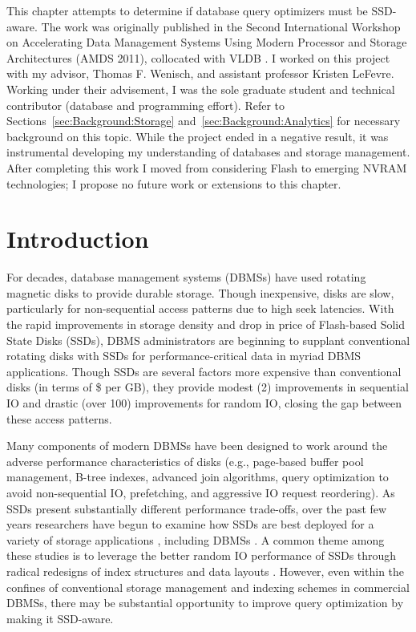 This chapter attempts to determine if database query optimizers must be SSD-aware.
The work was originally published in the Second International Workshop on Accelerating Data Management Systems Using Modern Processor and Storage Architectures (AMDS 2011), collocated with VLDB \cite{PelleyWenisch11}.
I worked on this project with my advisor, Thomas F. Wenisch, and assistant professor Kristen LeFevre.
Working under their advisement, I was the sole graduate student and technical contributor (database and programming effort).
Refer to Sections~\ref{sec:Background:Storage} and~\ref{sec:Background:Analytics} for necessary background on this topic.
While the project ended in a negative result, it was instrumental developing my understanding of databases and storage management.
After completing this work I moved from considering Flash to emerging NVRAM technologies; I propose no future work or extensions to this chapter.

\section{Introduction}
\label{sec:FlashOpti:Intro}

For decades, database management systems (DBMSs) have used rotating magnetic disks to provide durable storage.
Though inexpensive, disks are slow, particularly for non-sequential access patterns due to high seek latencies.
With the rapid improvements in storage density and drop in price of Flash-based Solid State Disks (SSDs), DBMS administrators are beginning to supplant conventional rotating disks with SSDs for performance-critical data in myriad DBMS applications.
Though SSDs are several factors more expensive than conventional disks (in terms of \$ per GB), they provide modest (2\texttimes) improvements in sequential IO and drastic (over 100\texttimes) improvements for random IO, closing the gap between these access patterns.

Many components of modern DBMSs have been designed to work around the adverse performance characteristics of disks (e.g., page-based buffer pool management, B-tree indexes, advanced join algorithms, query optimization to avoid non-sequential IO, prefetching, and aggressive IO request reordering).  
As SSDs present substantially different performance trade-offs, over the past few years researchers have begun to examine how SSDs are best deployed for a variety of storage applications \cite{Bouganim09uflip:understanding, Chen2009}, including DBMSs \cite{Lee2008, Yin2009, Li2009, Baumann2010, Tsirogiannis2009}.  
A common theme among these studies is to leverage the better random IO performance of SSDs through radical redesigns of index structures \cite{Yin2009, Li2009} and data layouts \cite{Baumann2010, Tsirogiannis2009}. 
However, even within the confines of conventional storage management and indexing schemes in commercial DBMSs, there may be substantial opportunity to improve query optimization by making it SSD-aware.

